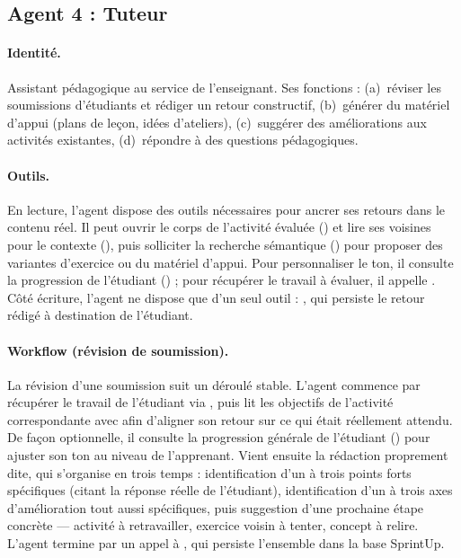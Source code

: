 \subsection{Agent 4 : Tuteur}
\label{sec:agent4}

\paragraph{Identité.} Assistant pédagogique au service de l'enseignant. Ses
fonctions : (a)~réviser les soumissions d'étudiants et rédiger un retour
constructif, (b)~générer du matériel d'appui (plans de leçon, idées
d'ateliers), (c)~suggérer des améliorations aux activités existantes,
(d)~répondre à des questions pédagogiques.

\paragraph{Outils.} En lecture, l'agent dispose des outils nécessaires
pour ancrer ses retours dans le contenu réel. Il peut ouvrir le corps
de l'activité évaluée () et lire
ses voisines pour le contexte
(), puis solliciter la
recherche sémantique
() pour proposer
des variantes d'exercice ou du matériel d'appui. Pour personnaliser
le ton, il consulte la progression de l'étudiant
() ; pour
récupérer le travail à évaluer, il appelle
. Côté écriture,
l'agent ne dispose que d'un seul outil :
, qui persiste
le retour rédigé à destination de l'étudiant.

\paragraph{Workflow (révision de soumission).}
La révision d'une soumission suit un déroulé stable. L'agent
commence par récupérer le travail de l'étudiant via
, puis lit les
objectifs de l'activité correspondante avec
 afin d'aligner son retour sur ce
qui était réellement attendu. De façon optionnelle, il consulte la
progression générale de l'étudiant
() pour ajuster son ton
au niveau de l'apprenant. Vient ensuite la rédaction proprement
dite, qui s'organise en trois temps : identification d'un à trois
points forts spécifiques (citant la réponse réelle de l'étudiant),
identification d'un à trois axes d'amélioration tout aussi
spécifiques, puis suggestion d'une prochaine étape concrète —
activité à retravailler, exercice voisin à tenter, concept à
relire. L'agent termine par un appel à
, qui
persiste l'ensemble dans la base SprintUp.

